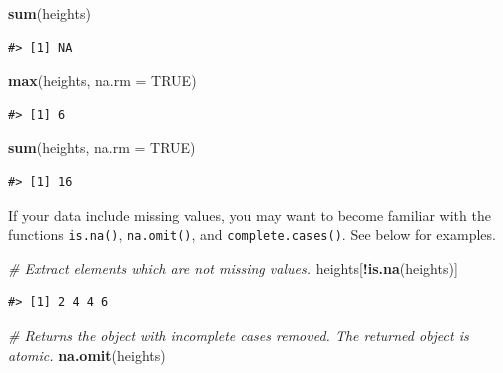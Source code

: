 \documentclass[]{book}
\newenvironment{Shaded}{\begin{snugshade}}{\end{snugshade}}
\newcommand{\KeywordTok}[1]{\textcolor[rgb]{0.13,0.29,0.53}{\textbf{#1}}}
\newcommand{\DataTypeTok}[1]{\textcolor[rgb]{0.13,0.29,0.53}{#1}}
\newcommand{\CommentTok}[1]{\textcolor[rgb]{0.56,0.35,0.01}{\textit{#1}}}
\newcommand{\OtherTok}[1]{\textcolor[rgb]{0.56,0.35,0.01}{#1}}
\newcommand{\OperatorTok}[1]{\textcolor[rgb]{0.81,0.36,0.00}{\textbf{#1}}}
\newcommand{\NormalTok}[1]{#1}
\theoremstyle{definition}
\theoremstyle{definition}
\theoremstyle{definition}
\theoremstyle{remark}
\begin{document}
\begin{Shaded}
\begin{Highlighting}[]
\KeywordTok{sum}\NormalTok{(heights)}
\end{Highlighting}
\end{Shaded}

\begin{verbatim}
#> [1] NA
\end{verbatim}

\begin{Shaded}
\begin{Highlighting}[]
\KeywordTok{max}\NormalTok{(heights, }\DataTypeTok{na.rm =} \OtherTok{TRUE}\NormalTok{)}
\end{Highlighting}
\end{Shaded}

\begin{verbatim}
#> [1] 6
\end{verbatim}

\begin{Shaded}
\begin{Highlighting}[]
\KeywordTok{sum}\NormalTok{(heights, }\DataTypeTok{na.rm =} \OtherTok{TRUE}\NormalTok{)}
\end{Highlighting}
\end{Shaded}

\begin{verbatim}
#> [1] 16
\end{verbatim}

If your data include missing values, you may want to become familiar
with the functions \texttt{is.na()}, \texttt{na.omit()}, and
\texttt{complete.cases()}. See below for examples.

\begin{Shaded}
\begin{Highlighting}[]
\CommentTok{# Extract elements which are not missing values.}
\NormalTok{heights[}\OperatorTok{!}\KeywordTok{is.na}\NormalTok{(heights)]}
\end{Highlighting}
\end{Shaded}

\begin{verbatim}
#> [1] 2 4 4 6
\end{verbatim}

\begin{Shaded}
\begin{Highlighting}[]
\CommentTok{# Returns the object with incomplete cases removed. The returned object is atomic.}
\KeywordTok{na.omit}\NormalTok{(heights)}
\end{Highlighting}
\end{Shaded}
\end{document}
